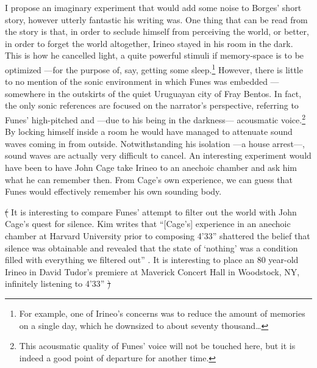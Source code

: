 I propose an imaginary experiment that would add some noise to Borges' short story, however utterly fantastic his writing was. One thing that can be read from the story is that, in order to seclude himself from perceiving the world, or better, in order to forget the world altogether, Irineo stayed in his room in the dark. This is how he cancelled light, a quite powerful stimuli if memory-space is to be optimized ---for the purpose of, say, getting some sleep.\footnote{For example, one of Irineo's concerns was to reduce the amount of memories on a single day, which he downsized to about seventy thousand\dots} However, there is little to no mention of the sonic environment in which Funes was embedded ---somewhere in the outskirts of the quiet Uruguayan city of Fray Bentos. In fact, the only sonic references are focused on the narrator's perspective, referring to Funes' high-pitched and ---due to his being in the darkness--- acousmatic voice.\footnote{This acousmatic quality of Funes' voice will not be touched here, but it is indeed a good point of departure for another time.} By locking himself inside a room he would have managed to attenuate sound waves coming in from outside. Notwithstanding his isolation ---a house arrest---, sound waves are actually very difficult to cancel. An interesting experiment would have been to have John Cage take Irineo to an anechoic chamber and ask him what he can remember then. From Cage's own experience, we can guess that Funes would effectively remember his own sounding body.

\sout{(} It is interesting to compare Funes' attempt to filter out the world with John Cage's quest for silence. Kim \textcite{Cas00:The} writes that ``[Cage's] experience in an anechoic chamber at Harvard University prior to composing 4'33'' shattered the belief that silence was obtainable and revealed that the state of `nothing' was a condition filled with everything we filtered out'' \parencite[14]{Cas00:The}. It is interesting to place an 80 year-old Irineo in David Tudor's premiere at Maverick Concert Hall in Woodstock, NY, infinitely listening to 4'33'' \sout{)}

